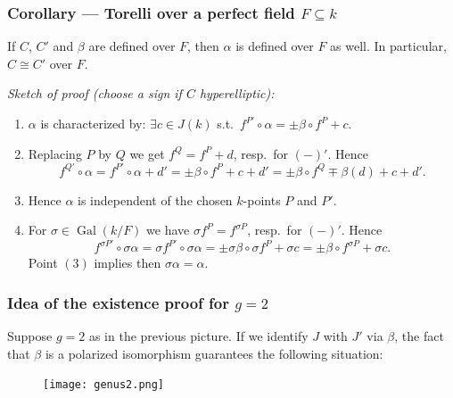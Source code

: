 \documentclass[notheorems, hyperref]{beamer}
\theoremstyle{darkgreentheorem}
\theoremstyle{darkbluedefinition}
\theoremstyle{darkredexample}
\theoremstyle{remark}
\begin{document}
\begin{frame}
    \frametitle{Corollary --- Torelli over a perfect field $F\subseteq k$} 
    \begin{tcolorbox}[colback=blue!5!white,colframe=blue!5!white]
    If $C$, $C'$ and $\beta$ are defined over $F$, then $\alpha$ is defined over $F$ as well.
	In particular, $C\cong C'$ over $F$.
    \end{tcolorbox}
    \pause
    \textit{Sketch of proof (choose a sign if $C$ hyperelliptic):}
    \begin{enumerate}[label=(\arabic*)]
	\item $\alpha$ is characterized by: $\exists c\in J(k)$ s.t.~$f^{P'}\circ \alpha=\pm \beta\circ f^{P}+c$.
	    \pause
	\item Replacing $P$ by $Q$ we get $f^{Q}=f^{P}+d$, resp.~for $(-)'$.
	    Hence
	    \[ f^{Q'}\circ \alpha=f^{P'}\circ \alpha+d'=\pm \beta \circ f^{P}+c+d'=\pm \beta \circ f^{Q}\mp \beta(d)+c+d'. \]
	    \pause
	\item Hence $\alpha$ is independent of the chosen $k$-points $P$ and $P'$.
	    \pause
	\item For $\sigma\in \operatorname{Gal}(k/F)$ we have $\sigma f^{P}=f^{\sigma P}$, resp.~for $(-)'$.
	    Hence
	    \[ f^{\sigma P'}\circ \sigma\alpha =\sigma f^{P'}\circ \sigma \alpha=\pm \sigma \beta\circ \sigma f^{P}+\sigma c=\pm \beta \circ f^{\sigma P}+\sigma c. \]
	    Point $(3)$ implies then $\sigma \alpha=\alpha$.
    \end{enumerate}
\end{frame}

\begin{frame}
    \frametitle{Idea of the existence proof for $g=2$}
    Suppose $g=2$ as in the previous picture.
    If we identify $J$ with $J'$ via $\beta$, the fact that $\beta$ is a polarized isomorphism guarantees the following situation:
    \begin{figure}[htp]
	\centering
	\texttt{[image: genus2.png]}
    \end{figure}
\end{frame}
\end{document}
